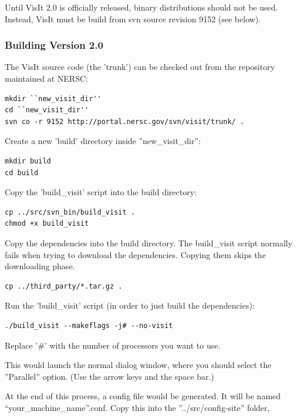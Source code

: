 \documentclass[12pt]{article}
\begin{document}
Until VisIt 2.0 is officially released, binary distributions should not be
used.  Instead, VisIt must be build from svn source revision 9152 (see below).

\subsubsection{Building Version 2.0}
\label{subsec:VisItVersion2_Build}

The VisIt source code (the 'trunk') can be checked out from the
repository maintained at NERSC:

\begin{verbatim}
mkdir ``new_visit_dir''
cd ``new_visit_dir'' 
svn co -r 9152 http://portal.nersc.gov/svn/visit/trunk/ .
\end{verbatim}

Create a new 'build' directory inside ''new\_visit\_dir'':

\begin{verbatim}
mkdir build
cd build
\end{verbatim}

Copy the 'build\_visit' script into the build directory:

\begin{verbatim}
cp ../src/svn_bin/build_visit .
chmod +x build_visit
\end{verbatim}

Copy the dependencies into the build directory. The build\_visit script
normally fails when trying to download the dependencies.  Copying them
skips the downloading phase.

\begin{verbatim}
cp ../third_party/*.tar.gz .
\end{verbatim}

Run the 'build\_visit' script (in order to just build the dependencies):

\begin{verbatim}
./build_visit --makeflags -j# --no-visit
\end{verbatim}

Replace '\#' with the number of processors you want to use.

This would launch the normal dialog window, where you should select
the ''Parallel'' option.  (Use the arrow keys and the space bar.)

At the end of this process, a config file would be generated. It will
be named ``your\_machine\_name''.conf. Copy this into the
''../src/config-site'' folder,
\end{document}
